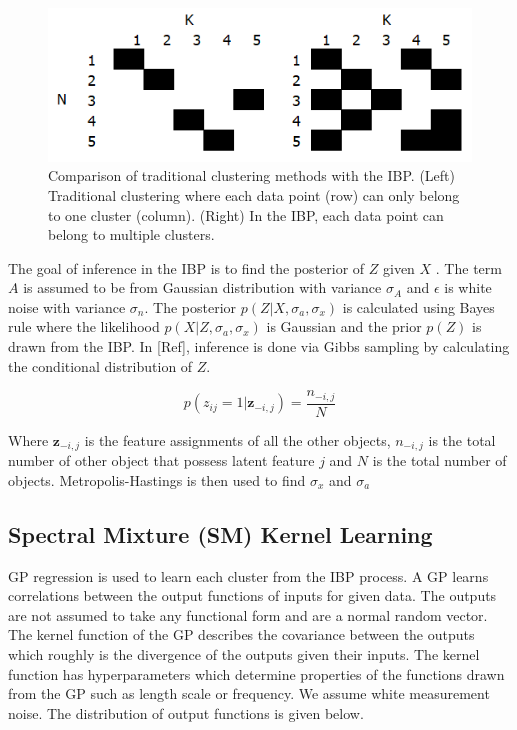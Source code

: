 \documentclass{article}
\begin{document}
\begin{figure}[ht]
\vskip 0.2in
\begin{center}
\centerline{\includegraphics[width=\columnwidth]{IBPcomp}}
\caption{Comparison of traditional clustering methods with the IBP. (Left) Traditional clustering where each data point (row) can only belong to one cluster (column). (Right) In the IBP, each data point can belong to multiple clusters.}
\label{IBPcomp}
\end{center}
\vskip -0.2in
\end{figure} 

The goal of inference in the IBP is to find the posterior of $Z$ given $X$ . The term $A$ is assumed to be from Gaussian distribution with variance $\sigma_{A}$ and $\epsilon$ is white noise with variance $\sigma_n$. The posterior $p(Z|X,\sigma_a,\sigma_x)$ is calculated using Bayes rule where the likelihood $p(X|Z,\sigma_a,\sigma_x)$ is Gaussian and the prior $p(Z)$ is drawn from the IBP. In [Ref], inference is done via Gibbs sampling by calculating the conditional distribution of $Z$.

$$
p(z_{ij}=1|\textbf{z}_{-i,j})=\frac{n_{-i,j}}{N}
$$

Where $\textbf{z}_{-i,j}$ is the feature assignments of all the other objects, $n_{-i,j}$ is the total number of other object that possess latent feature $j$ and $N$ is the total number of objects. Metropolis-Hastings is then used to find $\sigma_x$ and $\sigma_a$

\subsection{Spectral Mixture (SM) Kernel Learning}

GP regression is used to learn each cluster from the IBP process. A GP learns correlations between the output functions of inputs for given data. The outputs are not assumed to take any functional form and are a normal random vector. The kernel function of the GP describes the covariance between the outputs which roughly is the divergence of the outputs given their inputs. The kernel function has hyperparameters which determine properties of the functions drawn from the GP such as length scale or frequency. We assume white measurement noise. The distribution of output functions is given below.
\end{document}
